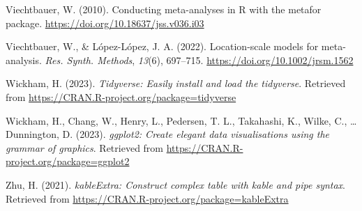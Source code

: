 \documentclass[
  man,floatsintext]{apa6}
\newlength{\cslhangindent}
\newenvironment{CSLReferences}[2] %
 {\begin{list}{}{%
  \setlength{\itemindent}{0pt}
  \setlength{\leftmargin}{0pt}
  \setlength{\parsep}{0pt}
  \ifodd #1
   \setlength{\leftmargin}{\cslhangindent}
   \setlength{\itemindent}{-1\cslhangindent}
  \fi
  \setlength{\itemsep}{#2\baselineskip}}}
 {\end{list}}
\begin{document}
\begin{CSLReferences}{1}{0}
Viechtbauer, W. (2010). Conducting meta-analyses in {R} with the {metafor} package. \url{https://doi.org/10.18637/jss.v036.i03}

Viechtbauer, W., \& López-López, J. A. (2022). Location-scale models for meta-analysis. \emph{Res. Synth. Methods}, \emph{13}(6), 697--715. \url{https://doi.org/10.1002/jrsm.1562}

Wickham, H. (2023). \emph{Tidyverse: Easily install and load the tidyverse}. Retrieved from \url{https://CRAN.R-project.org/package=tidyverse}

Wickham, H., Chang, W., Henry, L., Pedersen, T. L., Takahashi, K., Wilke, C., \ldots{} Dunnington, D. (2023). \emph{ggplot2: Create elegant data visualisations using the grammar of graphics}. Retrieved from \url{https://CRAN.R-project.org/package=ggplot2}

Zhu, H. (2021). \emph{kableExtra: Construct complex table with kable and pipe syntax}. Retrieved from \url{https://CRAN.R-project.org/package=kableExtra}

\end{CSLReferences}
\end{document}
